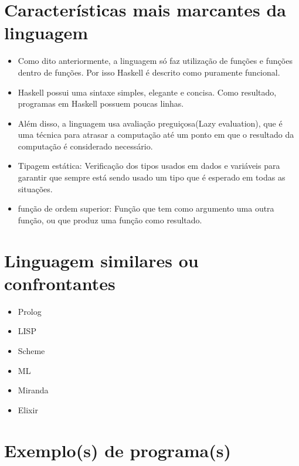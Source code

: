 \documentclass[
  article,			       %
  12pt,				         %
  oneside,			       %
  a4paper,			       %
  english,		       	 %
  brazil,			      	 %
  sumario=tradicional
]{abntex2}
\begin{document}
    \newpage

    \chapter{Características mais marcantes da linguagem}

    \begin{itemize}
      \item Como dito anteriormente, a linguagem só faz utilização de funções e funções dentro de funções. Por isso
      Haskell é descrito como puramente funcional.
      \item Haskell possui uma sintaxe simples, elegante e concisa. Como resultado, programas em Haskell possuem 
      poucas linhas. 
      \item Além disso, a linguagem usa avaliação preguiçosa(Lazy evaluation), que é uma técnica para atrasar a computação 
      até um ponto em que o resultado da computação é considerado necessário.
      \item Tipagem estática: Verificação dos tipos usados em dados e variáveis para 
      garantir que sempre está sendo usado um tipo que é esperado em todas as situações. 
      \item função de ordem superior: Função que tem como argumento uma outra função, ou que produz 
      uma função como resultado.
    \end{itemize}

    \newpage 

    \chapter{Linguagem similares ou confrontantes}

    \begin{itemize}
      \item Prolog
      \item LISP 
      \item Scheme 
      \item ML 
      \item Miranda 
      \item Elixir 
    \end{itemize}

    \newpage

    \chapter{Exemplo(s) de programa(s)}
\end{document}
